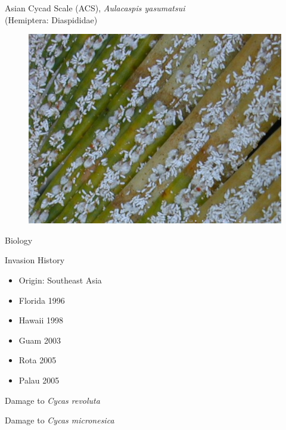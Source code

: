 \documentclass[]{beamer}
\begin{document}
\begin{frame}{Asian Cycad Scale (ACS), \textit{Aulacaspis yasumatsui}\\(Hemiptera: Diaspididae)}
	\begin{figure}
		\includegraphics[height=0.7\textheight]{asian-cycad-scale/output-07.png}
	\end{figure}
\end{frame}


\begin{frame}{Biology}
\end{frame}

\begin{frame}{Invasion History}
	\begin{itemize}
		\item Origin: Southeast Asia
		\item Florida 1996
		\item Hawaii 1998
		\item Guam 2003
		\item Rota 2005
		\item Palau 2005
	\end{itemize}
\end{frame}

\begin{frame}{Damage to \textit{Cycas revoluta}}
\end{frame}

\begin{frame}{Damage to \textit{Cycas micronesica}}
\end{frame}
\end{document}
